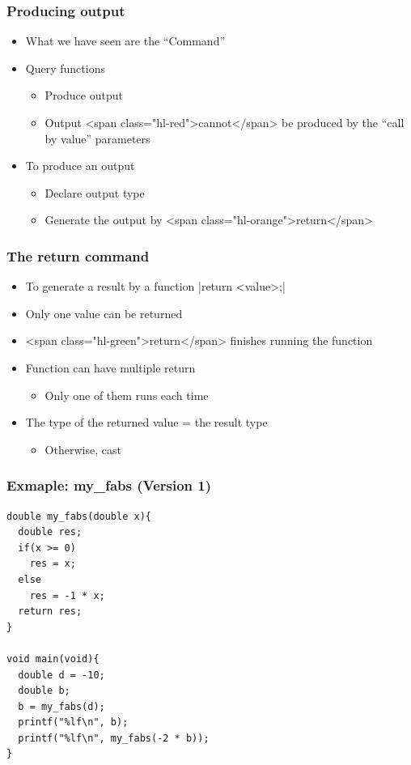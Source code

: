 \documentclass{../c-lecture}
\begin{document}
\begin{frame}
  \frametitle{Producing output}
  \begin{itemize}
    \item What we have seen are the “Command”
    \item Query functions
    \begin{itemize}
      \item Produce output
      \item
        Output <span class="hl-red">cannot</span> be produced by the “call by
        value” parameters

    \end{itemize}
    \item To produce an output
    \begin{itemize}
      \item Declare output type
      \item Generate the output by <span class="hl-orange">return</span>
    \end{itemize}
  \end{itemize}
\end{frame}

\begin{frame}[fragile]
  \frametitle{The return command}
  \begin{itemize}
    \item To generate a result by a function
    |return <value>;|
    \item Only one value can be returned
    \item <span class="hl-green">return</span> finishes running the function
    \item Function can have multiple return
    \begin{itemize}
      \item Only one of them runs each time
    \end{itemize}
    \item The type of the returned value = the result type
    \begin{itemize}
      \item Otherwise, cast
    \end{itemize}
  \end{itemize}
\end{frame}

\begin{frame}[fragile]
  \frametitle{Exmaple: my\_fabs (Version 1)}
  \begin{verbatim}
double my_fabs(double x){
  double res;
  if(x >= 0)
    res = x;
  else
    res = -1 * x;
  return res;
}

void main(void){
  double d = -10;
  double b;
  b = my_fabs(d);
  printf("%lf\n", b);
  printf("%lf\n", my_fabs(-2 * b));
}
  \end{verbatim}
\end{frame}
\end{document}
